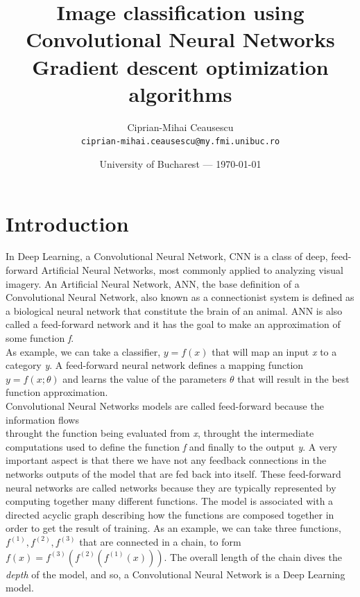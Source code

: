 \documentclass[12pt]{article}
\title{Image classification using Convolutional Neural Networks \\ Gradient descent optimization
algorithms} %
\author{Ciprian-Mihai Ceausescu\\ \texttt{ciprian-mihai.ceausescu@my.fmi.unibuc.ro}} %
\date{University of Bucharest --- \today} %
\begin{document}
\maketitle %


\section*{Introduction}

\hspace{10mm}In Deep Learning, a Convolutional Neural Network, CNN is a class of deep, feed-forward Artificial Neural Networks, most commonly applied to analyzing visual imagery. An Artificial Neural Network, ANN, the base definition of a Convolutional Neural Network, also known as a connectionist system is defined as a biological neural network that constitute the brain of an animal. ANN is also called a feed-forward network and it has the goal to make an approximation of some function \textit{f}. \\
\hspace*{10mm}As example, we can take a classifier, $y=f(x)$ that will map an input \textit{x} to a category \textit{y}. A feed-forward neural network defines a mapping function $y=f(x;\theta)$ and learns the value of the parameters $\theta$ that will result in the best function approximation.\\
\hspace*{10mm}Convolutional Neural Networks models are called feed-forward because the information flows\\ throught the function being evaluated from \textit{x}, throught the intermediate computations used to define the function \textit{f} and finally to the output \textit{y}. A very important aspect is that there we have not any feedback connections in the networks outputs of the model that are fed back into itself. These feed-forward neural networks are called networks because they are typically represented by computing together many different functions. The model is associated with a directed acyclic graph describing how the functions are composed together in order to get the result of training. As an example, we can take three functions, 
$f^{(1)}, f^{(2)}, f^{(3)}$ that are connected in a chain, to form $f(x)=f^{(3)}(f^{(2)}(f^{(1)}(x)))$. The overall length of the chain dives the \textit{depth} of the model, and so, a Convolutional Neural Network is a Deep Learning model.
\end{document}
